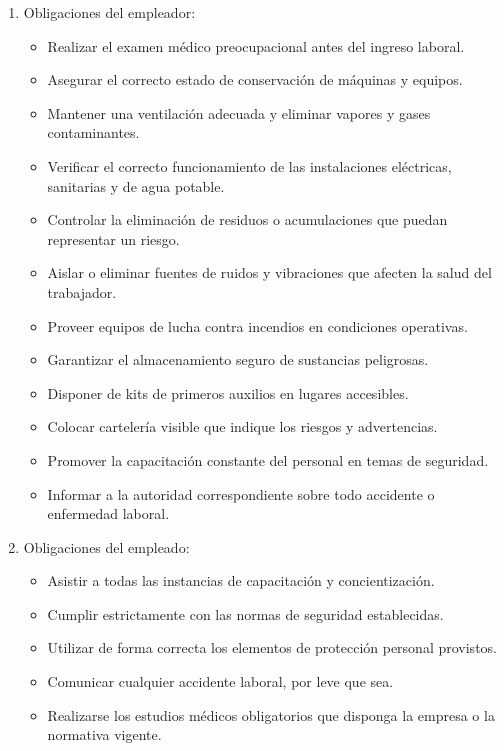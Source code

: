 \documentclass[a4paper,oneside,11pt]{article}
\begin{document}
\begin{enumerate}
    \item Obligaciones del empleador:
        \begin{itemize}
          \item Realizar el examen médico preocupacional antes del ingreso laboral.
          \item Asegurar el correcto estado de conservación de máquinas y equipos.
          \item Mantener una ventilación adecuada y eliminar vapores y gases contaminantes.
          \item Verificar el correcto funcionamiento de las instalaciones eléctricas, sanitarias y de agua potable.
          \item Controlar la eliminación de residuos o acumulaciones que puedan representar un riesgo.
          \item Aislar o eliminar fuentes de ruidos y vibraciones que afecten la salud del trabajador.
          \item Proveer equipos de lucha contra incendios en condiciones operativas.
          \item Garantizar el almacenamiento seguro de sustancias peligrosas.
          \item Disponer de kits de primeros auxilios en lugares accesibles.
          \item Colocar cartelería visible que indique los riesgos y advertencias.
          \item Promover la capacitación constante del personal en temas de seguridad.
          \item Informar a la autoridad correspondiente sobre todo accidente o enfermedad laboral.
        \end{itemize}

    \item Obligaciones del empleado:
        \begin{itemize}
          \item Asistir a todas las instancias de capacitación y concientización.
          \item Cumplir estrictamente con las normas de seguridad establecidas.
          \item Utilizar de forma correcta los elementos de protección personal provistos.
          \item Comunicar cualquier accidente laboral, por leve que sea.
          \item Realizarse los estudios médicos obligatorios que disponga la empresa o la normativa vigente.
        \end{itemize}
\end{enumerate}
\end{document}
